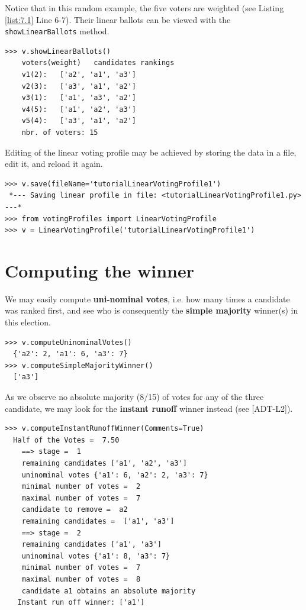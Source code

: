 Notice that in this random example, the five voters are weighted (see Listing \ref{list:7.1} Line 6-7). Their linear ballots can be viewed with the \texttt{showLinearBallots} method.

\begin{lstlisting}[basicstyle=\footnotesize]
>>> v.showLinearBallots()
    voters(weight)	 candidates rankings
    v1(2): 	 ['a2', 'a1', 'a3']
    v2(3): 	 ['a3', 'a1', 'a2']
    v3(1): 	 ['a1', 'a3', 'a2']
    v4(5): 	 ['a1', 'a2', 'a3']
    v5(4): 	 ['a3', 'a1', 'a2']
    nbr. of voters: 15
\end{lstlisting}

Editing of the linear voting profile may be achieved by storing the data in a file, edit it, and reload it again.

\begin{lstlisting}[basicstyle=\footnotesize]
>>> v.save(fileName='tutorialLinearVotingProfile1')
 *--- Saving linear profile in file: <tutorialLinearVotingProfile1.py> ---*
>>> from votingProfiles import LinearVotingProfile
>>> v = LinearVotingProfile('tutorialLinearVotingProfile1')
\end{lstlisting}

\section{Computing the winner}
\label{sec:7.2}

We may easily compute \textbf{uni-nominal votes}, i.e. how many times a candidate was ranked first, and see who is consequently the \textbf{simple majority} winner(s) in this election.

\begin{lstlisting}[basicstyle=\footnotesize]
>>> v.computeUninominalVotes()
  {'a2': 2, 'a1': 6, 'a3': 7}
>>> v.computeSimpleMajorityWinner()
  ['a3']
\end{lstlisting}

As we observe no absolute majority (8/15) of votes for any of the three candidate, we may look for the \textbf{instant runoff} winner instead (see [ADT-L2]).

\begin{lstlisting}[caption={Example Instant Run Off Winner},label=list:7.2,basicstyle=\footnotesize]
>>> v.computeInstantRunoffWinner(Comments=True)
  Half of the Votes =  7.50
    ==> stage =  1
	remaining candidates ['a1', 'a2', 'a3']
	uninominal votes {'a1': 6, 'a2': 2, 'a3': 7}
	minimal number of votes =  2
	maximal number of votes =  7
	candidate to remove =  a2
	remaining candidates =  ['a1', 'a3']
    ==> stage =  2
	remaining candidates ['a1', 'a3']
	uninominal votes {'a1': 8, 'a3': 7}
	minimal number of votes =  7
	maximal number of votes =  8
	candidate a1 obtains an absolute majority
   Instant run off winner: ['a1']
 \end{lstlisting}

